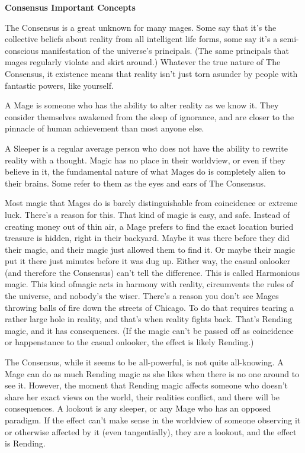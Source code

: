 \documentclass[letterpaper,12pt]{article}
\newcommand{\TITLE}[1]{\begin{center}{\titlefont\Huge\textbf{#1}}\end{center}}
\newcommand{\SECTION}[1]{\vspace{.5em}{\noindent\titlefont\large\textbf{#1}}

}
\begin{document}
\TITLE{Consensus Important Concepts}

\SECTION{The Consensus}
The Consensus is a great unknown for many mages. Some say that it's
the collective beliefs about reality from all intelligent life forms,
some say it's a semi-conscious manifestation of the universe's
principals. (The same principals that mages regularly violate and
skirt around.) Whatever the true nature of The Consensus, it existence
means that reality isn't just torn asunder by people with fantastic
powers, like yourself.

\SECTION{Mage}
A Mage is someone who has the ability to alter reality as we know
it. They consider themselves awakened from the sleep of ignorance, and
are closer to the pinnacle of human achievement than most anyone
else.

\SECTION{Sleeper}
A Sleeper is a regular average person who does not have the ability to
rewrite reality with a thought. Magic has no place in their worldview,
or even if they believe in it, the fundamental nature of what Mages do
is completely alien to their brains. Some refer to them as the eyes
and ears of The Consensus.

\SECTION{Rending Magic}
Most magic that Mages do is barely distinguishable from coincidence or
extreme luck. There's a reason for this. That kind of magic is easy,
and safe. Instead of creating money out of thin air, a Mage prefers to
find the exact location buried treasure is hidden, right in their
backyard. Maybe it was there before they did their magic, and their
magic just allowed them to find it. Or maybe their magic put it there
just minutes before it was dug up. Either way, the casual onlooker
(and therefore the Consensus) can't tell the difference. This is called
Harmonious magic. This kind ofmagic acts in harmony with reality, 
circumvents the rules of the universe, and nobody's the wiser. There's a 
reason you don't see Mages throwing balls of fire down the streets of 
Chicago. To do that requires tearing a rather large hole in reality, and
that's when reality fights back. That's Rending magic, and it has
consequences. (If the magic can't be passed off as coincidence or
happenstance to the casual onlooker, the effect is likely Rending.)

\SECTION{Lookout}
The Consensus, while it seems to be all-powerful, is not quite
all-knowing. A Mage can do as much Rending magic as she likes when
there is no one around to see it. However, the moment that Rending
magic affects someone who doesn't share her exact views on the world,
their realities conflict, and there will be consequences. A lookout
is any sleeper, or any Mage who has an opposed paradigm. If the effect
can't make sense in the worldview of someone observing it or
otherwise affected by it (even tangentially), they are a lookout, and
the effect is Rending.
\end{document}
